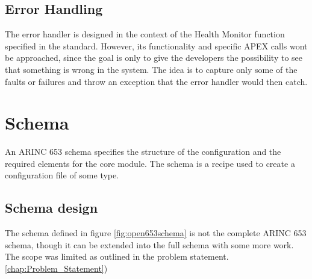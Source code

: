 \subsection{Error Handling}
The error handler is designed in the context of the 
Health Monitor function specified in the standard. 
However, its functionality and specific APEX calls won\textquotesingle t be
approached, since the goal is only to give the developers the possibility
to see that something is wrong in the system. The idea is to capture only
some of the faults or failures and throw an exception that the error
handler would then catch.

\section{Schema}
\label{sec:design_schema}
An ARINC 653 schema specifies the structure 
of the configuration and the required elements 
for the core module.
The schema is a recipe used to create a configuration file of some type.

\subsection{Schema design}

The schema defined in figure \ref{fig:open653schema} is not the complete
ARINC 653 schema, though it can be extended
into the full schema with some more work.
The scope was limited as outlined in the
problem statement. \ref{chap:Problem_Statement}) 

